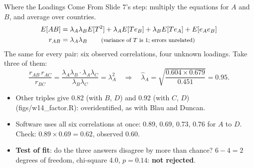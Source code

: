 \documentclass[aspectratio=169,11pt,xcolor=dvipsnames]{beamer}
\newcommand{\srcp}[1]{{\scriptsize\color{gray}(#1)}}
\begin{document}
\begin{frame}{Where the Loadings Come From}
Slide 7's step: multiply the equations for $A$ and $B$, and average over countries.
\begin{align*}
  E[A B] &= \lambda_A \lambda_B E[T^2] + \lambda_A E[T e_B] + \lambda_B E[T e_A] + E[e_A e_B] \\
  r_{AB} &= \lambda_A \lambda_B \qquad \text{\footnotesize (variance of $T$ is 1; errors unrelated)}
\end{align*}
\vskip-6pt
The same for every pair: six observed correlations, four unknown loadings. Take three of them:
\[ \frac{r_{AB}\, r_{AC}}{r_{BC}} = \frac{\lambda_A \lambda_B \cdot \lambda_A \lambda_C}{\lambda_B \lambda_C}
   = \lambda_A^2 \quad\Longrightarrow\quad
   \hat\lambda_A = \sqrt{\frac{0.604 \times 0.679}{0.451}} = 0.95 . \]
\vskip-4pt
\begin{itemize}\itemsep3pt
  \item Other triples give 0.82 (with $B$, $D$) and 0.92 (with $C$, $D$)
        \srcp{figs/w14\_factor.R}: overidentified, as with Blau and Duncan.
  \item Software uses all six correlations at once: 0.89, 0.69, 0.73, 0.76 for $A$ to $D$. Check:
        $0.89 \times 0.69 = 0.62$, observed 0.60.
  \item \textbf{Test of fit}: do the three answers disagree by more than chance? $6 - 4 = 2$
        degrees of freedom, chi-square 4.0, $p = 0.14$: \textbf{not rejected}.
\end{itemize}
\end{frame}
\end{document}
